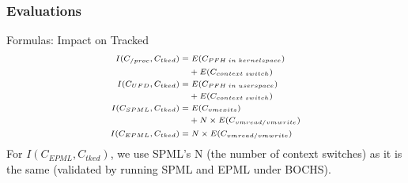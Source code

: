 \documentclass[xcolor=table,bigger,unknownkeysallowed]{beamer}
\begin{document}
        \begin{frame}
			\frametitle{Evaluations}
			\begin{block}{Formulas: Impact on Tracked}
				\begin{equation}\scriptsize
					\begin{split}
						I(C_{/proc},C_{tked}) = & \; E(C_{PFH \; in \; kernelspace})\\
												& + E(C_{context \; switch})\\
						I(C_{UFD},C_{tked}) = & \; E(C_{PFH \; in \; userspace})\\
											& + E(C_{context \; switch}) \\
						I(C_{SPML},C_{tked}) = & \; E(C_{vmexits}) \\
											& + N \times E(C_{vmread/vmwrite})\\
						I(C_{EPML},C_{tked}) = & \; N \times E(C_{vmread/vmwrite})	
					\end{split}
					\label{eq:formula-impact-detailed}
				\end{equation}		
				For $I(C_{EPML},C_{tked})$, we use SPML's N (the number of context switches) as it is the same (validated by running SPML and EPML under BOCHS).
			\end{block}
        \end{frame}   
\end{document}
